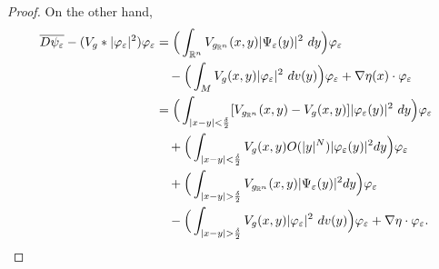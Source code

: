 \documentclass[10pt,a4paper]{amsart}
\def \R {\mathbb{R}}
\begin{document}
\begin{proof}
\noindent
On the other hand,
\begin{align}
\overline{D \psi_{\varepsilon}}-(V_{g}*|\varphi_{\varepsilon}|^{2})\varphi_{\varepsilon}&=\Big(\int_{\R^{n}}V_{g_{\R^{n}}}(x,y)|\Psi_{\varepsilon}(y)|^{2}\ dy \Big)\varphi_{\varepsilon} \notag\\ 
&\quad - \Big(\int_{M}V_{g}(x,y)|\varphi_{\varepsilon}|^{2}\ dv(y)\Big) \varphi_{\varepsilon}+\nabla\eta(x) \cdot \varphi_{\varepsilon}\notag\\
&=\Big(\int_{|x-y|<\frac{\delta}{2}}[V_{g_{\R^{n}}}(x,y)-V_{g}(x,y)]|\varphi_{\varepsilon}(y)|^{2}\ dy \Big) \varphi_{\varepsilon}\notag\\
&\quad + \Big(\int_{|x-y|<\frac{\delta}{2}}V_{g}(x,y)O(|y|^{N})|\varphi_{\varepsilon}(y)|^{2}dy\Big)\varphi_{\varepsilon}\notag\\
&\quad + \Big(\int_{|x-y|>\frac{\delta}{2}}V_{g_{\R^{n}}}(x,y)|\Psi_{\varepsilon}(y)|^{2} dy\Big) \varphi_{\varepsilon}\notag\\
&\quad - \Big(\int_{|x-y|>\frac{\delta}{2}}V_{g}(x,y)|\varphi_{\varepsilon}|^{2}\ dv(y) \Big) \varphi_{\varepsilon} +\nabla \eta \cdot \varphi_{\varepsilon}.\notag
\end{align}




\end{proof}
\end{document}
